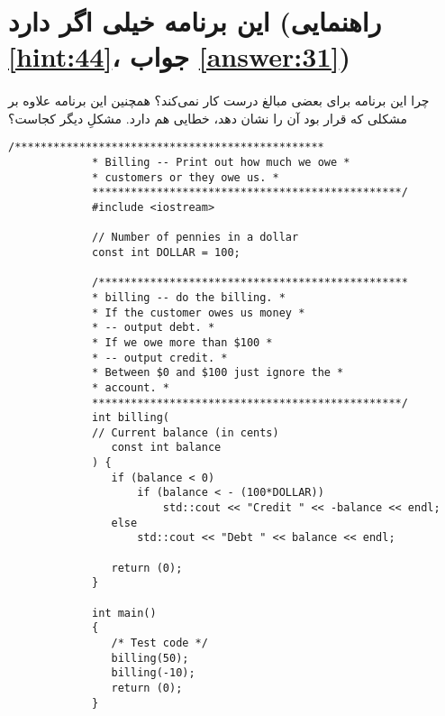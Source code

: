 \section[این برنامه خیلی اگر دارد]{این برنامه خیلی اگر دارد \protect{} (راهنمایی \ref{hint:44}، جواب \ref{answer:31})}
\paragraph{}\label{prog:13}
چرا این برنامه برای بعضی مبالغ درست کار نمی‌کند؟ همچنین این برنامه علاوه بر مشکلی که قرار بود آن را نشان دهد، خطایی هم دارد. مشکلِ دیگر کجاست؟

\begin{LTR}
        \begin{lstlisting}[style=C++Style]
             /************************************************
             * Billing -- Print out how much we owe *
             * customers or they owe us. *
             ************************************************/
             #include <iostream>

             // Number of pennies in a dollar
             const int DOLLAR = 100;

             /************************************************
             * billing -- do the billing. *
             * If the customer owes us money *
             * -- output debt. *
             * If we owe more than $100 *
             * -- output credit. *
             * Between $0 and $100 just ignore the *
             * account. *
             ************************************************/
             int billing(
             // Current balance (in cents)
             	const int balance
             ) {
             	if (balance < 0)
            		if (balance < - (100*DOLLAR))
             			std::cout << "Credit " << -balance << endl;
             	else
             		std::cout << "Debt " << balance << endl;

             	return (0);
             }

             int main()
             {
             	/* Test code */
             	billing(50);
             	billing(-10);
             	return (0);
             }
        \end{lstlisting}
\end{LTR}